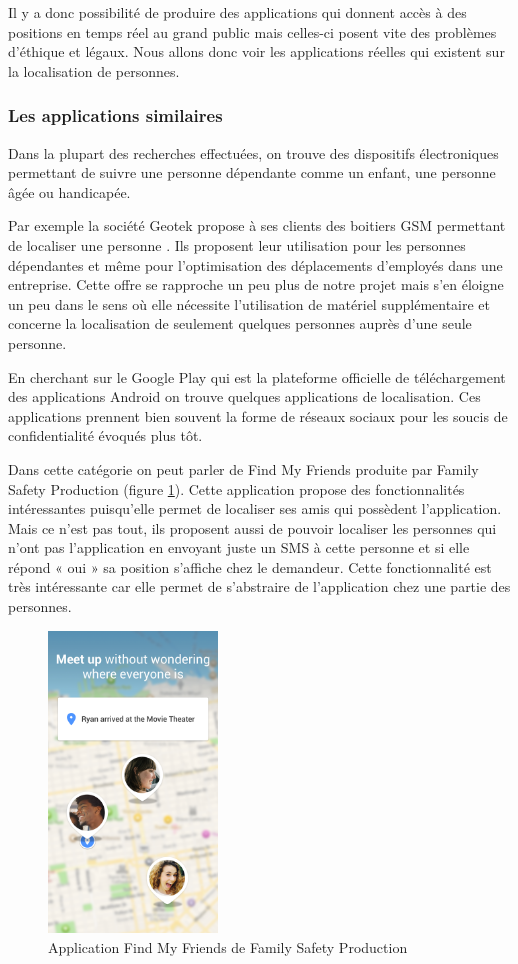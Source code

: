 Il y a donc possibilité de produire des applications qui donnent accès à des positions en temps réel au grand public mais celles-ci posent vite des problèmes d’éthique et légaux. Nous allons donc voir les applications réelles qui existent sur la localisation de personnes.

\subsubsection{Les applications similaires}

Dans la plupart des recherches effectuées, on trouve des dispositifs électroniques permettant de suivre une personne dépendante comme un enfant, une personne âgée ou handicapée.

Par exemple la société Geotek propose à ses clients des boitiers GSM permettant de localiser une personne \cite{bibgeotek}. Ils proposent leur utilisation pour les personnes dépendantes et même pour l’optimisation des déplacements d’employés dans une entreprise. Cette offre se rapproche un peu plus de notre projet mais s’en éloigne un peu dans le sens où elle nécessite l’utilisation de matériel supplémentaire et concerne la localisation de seulement quelques personnes auprès d’une seule personne.

En cherchant sur le Google Play qui est la plateforme officielle de téléchargement des applications Android on trouve quelques applications de localisation. Ces applications prennent bien souvent la forme de réseaux sociaux pour les soucis de confidentialité évoqués plus tôt.

Dans cette catégorie on peut parler de Find My Friends \cite{bibfindmyfriends} produite par Family Safety Production (figure \ref{findmyfriends}). Cette application propose des fonctionnalités intéressantes puisqu’elle permet de localiser ses amis qui possèdent l’application. Mais ce n’est pas tout, ils proposent aussi de pouvoir localiser les personnes qui n’ont pas l’application en envoyant juste un SMS à cette personne et si elle répond « oui » sa position s’affiche chez le demandeur. Cette fonctionnalité est très intéressante car elle permet de s’abstraire de l’application chez une partie des personnes.

\begin{figure}[H]
    \centering
    \includegraphics[height=8cm]{./img/findmyfriends.png}
    \caption{Application Find My Friends de Family Safety Production}
    \label{findmyfriends}
\end{figure}

